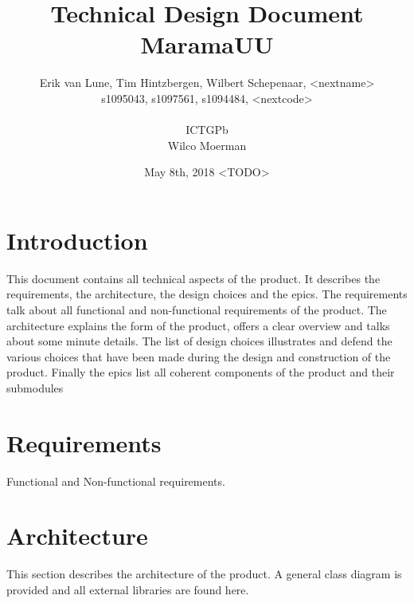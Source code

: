 \documentclass[10pt]{extarticle} %
\title{\huge Technical Design Document MaramaUU}
\author{Erik van Lune, Tim Hintzbergen, Wilbert Schepenaar, <nextname>    \\s1095043, s1097561, s1094484, <nextcode>
\\\\ICTGPb
\\Wilco Moerman}
\date{May 8th, 2018 <TODO>}
\begin{document}
    \maketitle
    \thispagestyle{empty}
    \newpage
    \newpage
    \setcounter{page}{1}
    \section {Introduction}
    This document contains all technical aspects of the product.
    It describes the requirements, the architecture, the design choices and the epics.
    The requirements talk about all functional and non-functional requirements of the product.
    The architecture explains the form of the product, offers a clear overview and talks about some minute details.
    The list of design choices illustrates and defend the various choices that have been made during the design and construction of the product.
    Finally the epics list all coherent components of the product and their submodules
    \newpage

    \tableofcontents{}
    \newpage

    \section{Requirements}
    Functional and Non-functional requirements.
    \newpage

    \section{Architecture}
    This section describes the architecture of the product.
    A general class diagram is provided and all external libraries are found here.
\end{document}
